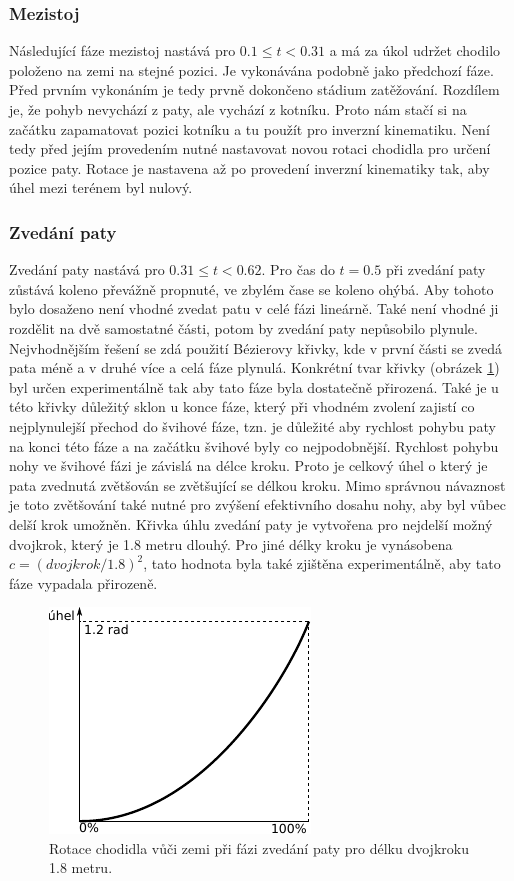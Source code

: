 \subsubsection{Mezistoj}
Následující fáze mezistoj nastává pro $0.1 \leq t < 0.31$ a má za úkol udržet chodilo položeno na zemi na stejné pozici. Je vykonávána podobně jako předchozí fáze. Před prvním vykonáním je tedy prvně dokončeno stádium zatěžování. Rozdílem je, že pohyb nevychází z paty, ale vychází z kotníku. Proto nám stačí si na začátku zapamatovat pozici kotníku a tu použít pro inverzní kinematiku. Není tedy před jejím provedením nutné nastavovat novou rotaci chodidla pro určení pozice paty. Rotace je nastavena až po provedení inverzní kinematiky tak, aby úhel mezi terénem byl nulový.

\subsubsection{Zvedání paty}
Zvedání paty nastává pro $0.31 \leq t < 0.62$. Pro čas do $t = 0.5$ při zvedání paty zůstává koleno převážně propnuté, ve zbylém čase se koleno ohýbá. Aby tohoto bylo dosaženo není vhodné zvedat patu v celé fázi lineárně. Také není vhodné ji rozdělit na dvě samostatné části, potom by zvedání paty nepůsobilo plynule. Nejvhodnějším řešení se zdá použití Bézierovy křivky, kde v první části se zvedá pata méně a v druhé více a celá fáze plynulá. Konkrétní tvar křivky (obrázek \ref{fig:heelRiseRot}) byl určen experimentálně tak aby tato fáze byla dostatečně přirozená. Také je u této křivky důležitý sklon u konce fáze, který při vhodném zvolení zajistí co nejplynulejší přechod do švihové fáze, tzn. je důležité aby rychlost pohybu paty na konci této fáze a na začátku švihové byly co nejpodobnější. Rychlost pohybu nohy ve švihové fázi je závislá na délce kroku. Proto je celkový úhel o který je pata zvednutá zvětšován se zvětšující se délkou kroku. Mimo správnou návaznost je toto zvětšování také nutné pro zvýšení efektivního dosahu nohy, aby byl vůbec delší krok umožněn. Křivka úhlu zvedání paty je vytvořena pro nejdelší možný dvojkrok, který je 1.8 metru dlouhý. Pro jiné délky kroku je vynásobena $c = (dvojkrok/1.8)^2$, tato hodnota byla také zjištěna experimentálně, aby tato fáze vypadala přirozeně.

\begin{figure}[h]
	\centering
	\includegraphics[width=0.3\linewidth]{fig/heelRiseRot.pdf}
	\caption{Rotace  chodidla vůči zemi při fázi zvedání paty pro délku dvojkroku 1.8 metru.}
	\label{fig:heelRiseRot}
\end{figure}

